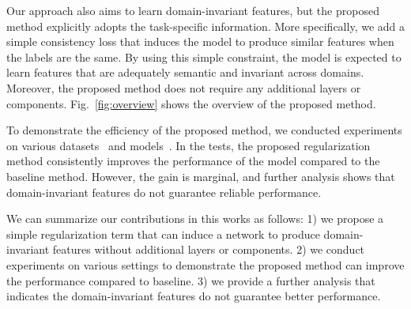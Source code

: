 Our approach also aims to learn domain-invariant features, but the proposed method explicitly adopts the task-specific information. More specifically, we add a simple consistency loss that induces the model to produce similar features when the labels are the same. By using this simple constraint, the model is expected to learn features that are adequately semantic and invariant across domains. Moreover, the proposed method does not require any additional layers or components. Fig.~\ref{fig:overview} shows the overview of the proposed method.

To demonstrate the efficiency of the proposed method, we conducted experiments on various datasets~\cite{chen2013vlcs, Li2017dg} and models~\cite{He2016resnet}. In the tests, the proposed regularization method consistently improves the performance of the model compared to the baseline method. However, the gain is marginal, and further analysis shows that domain-invariant features do not guarantee reliable performance.

We can summarize our contributions in this works as follows: 1) we propose a simple regularization term that can induce a network to produce domain-invariant features without additional layers or components. 2) we conduct experiments on various settings to demonstrate the proposed method can improve the performance compared to baseline. 3) we provide a further analysis that indicates the domain-invariant features do not guarantee better performance. 

